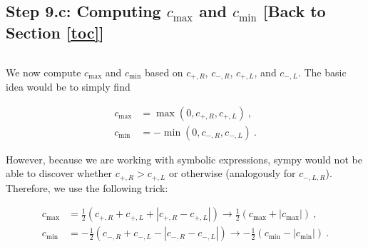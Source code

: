 \documentclass[landscape,letterpaper,10pt,english]{article}
\begin{document}
    \subsection{\texorpdfstring{Step 9.c: Computing \(c_{\max}\) and
\(c_{\min}\) {[}Back to
Section \ref{toc}{]}}{Step 9.c: Computing c\_\{\textbackslash{}max\} and c\_\{\textbackslash{}min\} {[}Back to {]}}}\label{step-9.c-computing-c_max-and-c_min-back-to-top}

\[\label{compute_cmax_and_cmin}\]

We now compute \(c_{\max}\) and \(c_{\min}\) based on \(c_{+,R}\),
\(c_{-,R}\), \(c_{+,L}\), and \(c_{-,L}\). The basic idea would be to
simply find

\begin{align}
c_{\max} &= \max\left(0,c_{+,R},c_{+,L}\right)\ ,\\
c_{\min} &= -\min\left(0,c_{-,R},c_{-,L}\right)\ .
\end{align}

However, because we are working with symbolic expressions, sympy would
not be able to discover whether \(c_{+,R}>c_{+,L}\) or otherwise
(analogously for \(c_{-,L,R}\)). Therefore, we use the following trick:

\begin{align}
c_{\max} &= \frac{1}{2}\left(c_{+,R} + c_{+,L} + \left|c_{+,R}-c_{+,L}\right|\right) \to \frac{1}{2}\left(c_{\max} + \left|c_{\max}\right|\right)\ ,\\
c_{\min} &= -\frac{1}{2}\left(c_{-,R} + c_{-,L} - \left|c_{-,R}-c_{-,L}\right|\right) \to -\frac{1}{2}\left(c_{\min} - \left|c_{\min}\right|\right)\ .
\end{align}
\end{document}
